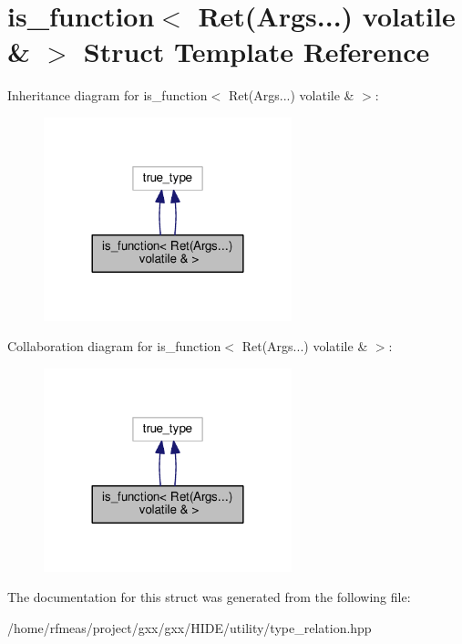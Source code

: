 \hypertarget{structis__function_3_01Ret_07Args_8_8_8_08_01volatile_01_6_01_4}{}\section{is\+\_\+function$<$ Ret(Args...) volatile \& $>$ Struct Template Reference}
\label{structis__function_3_01Ret_07Args_8_8_8_08_01volatile_01_6_01_4}


Inheritance diagram for is\+\_\+function$<$ Ret(Args...) volatile \& $>$\+:
\nopagebreak
\begin{figure}[H]
\begin{center}
\leavevmode
\includegraphics[width=204pt]{structis__function_3_01Ret_07Args_8_8_8_08_01volatile_01_6_01_4__inherit__graph}
\end{center}
\end{figure}


Collaboration diagram for is\+\_\+function$<$ Ret(Args...) volatile \& $>$\+:
\nopagebreak
\begin{figure}[H]
\begin{center}
\leavevmode
\includegraphics[width=204pt]{structis__function_3_01Ret_07Args_8_8_8_08_01volatile_01_6_01_4__coll__graph}
\end{center}
\end{figure}


The documentation for this struct was generated from the following file\+:\begin{DoxyCompactItemize}
\item 
/home/rfmeas/project/gxx/gxx/\+H\+I\+D\+E/utility/type\+\_\+relation.\+hpp\end{DoxyCompactItemize}
